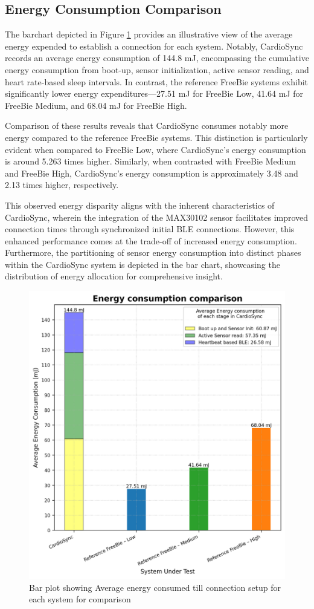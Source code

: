 \subsection{Energy Consumption Comparison}
The barchart depicted in Figure \ref{fig:energy_comp} provides an illustrative view of the average energy expended to establish a connection for each system. Notably, CardioSync records an average energy consumption of 144.8 mJ, encompassing the cumulative energy consumption from boot-up, sensor initialization, active sensor reading, and heart rate-based sleep intervals. In contrast, the reference FreeBie systems exhibit significantly lower energy expenditures—27.51 mJ for FreeBie Low, 41.64 mJ for FreeBie Medium, and 68.04 mJ for FreeBie High.

\noindent Comparison of these results reveals that CardioSync consumes notably more energy compared to the reference FreeBie systems. This distinction is particularly evident when compared to FreeBie Low, where CardioSync's energy consumption is around 5.263 times higher. Similarly, when contrasted with FreeBie Medium and FreeBie High, CardioSync's energy consumption is approximately 3.48 and 2.13 times higher, respectively.

\noindent This observed energy disparity aligns with the inherent characteristics of CardioSync, wherein the integration of the MAX30102 sensor facilitates improved connection times through synchronized initial BLE connections. However, this enhanced performance comes at the trade-off of increased energy consumption. Furthermore, the partitioning of sensor energy consumption into distinct phases within the CardioSync system is depicted in the bar chart, showcasing the distribution of energy allocation for comprehensive insight.

\begin{figure}[H]
    \centering
    \includegraphics[width=0.7\linewidth]{chapters/Results/Energy_comparison.png}
    \caption{Bar plot showing Average energy consumed till connection setup for each system for comparison}
    \label{fig:energy_comp}
\end{figure}


